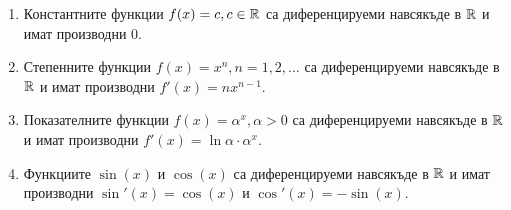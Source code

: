 \documentclass[numbers=endperiod, bibliography=totocnumbered]{scrartcl}
\begin{document}
\begin{theorem}
  \mbox{}
  \begin{enumerate}
    \item Константните функции \( f(x) = c, c \in \mathbb{R} \) са диференцируеми навсякъде в \( \mathbb{R} \) и имат производни \( 0 \).
    \item Степенните функции \( f(x) = x^n, n = 1, 2, \ldots \) са диференцируеми навсякъде в \( \mathbb{R} \) и имат производни \( f'(x) = n x^{n-1} \).
    \item Показателните функции \( f(x) = \alpha^x, \alpha > 0 \) са диференцируеми навсякъде в \( \mathbb{R} \) и имат производни \( f'(x) = \ln \alpha \cdot \alpha^x \).
    \item Функциите \( \sin(x) \) и \( \cos(x) \) са диференцируеми навсякъде в \( \mathbb{R} \) и имат производни \( \sin'(x) = \cos(x) \) и \( \cos'(x) = -\sin(x) \).
  \end{enumerate}
\end{theorem}
\end{document}

